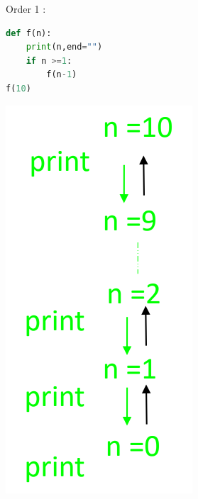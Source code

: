 \documentclass[12pt,oneside]{book}
\begin{document}
\begin{minipage}{0.3\linewidth}
	Order 1 :\\
\begin{lstlisting}[language=python]
def f(n):
	print(n,end="")
	if n >=1:
		f(n-1)
f(10)
\end{lstlisting}
\end{minipage}
\begin{minipage}{0.1\linewidth}
	\includegraphics[width=\linewidth]{../pic/python/5}
\end{minipage}
\end{document}
